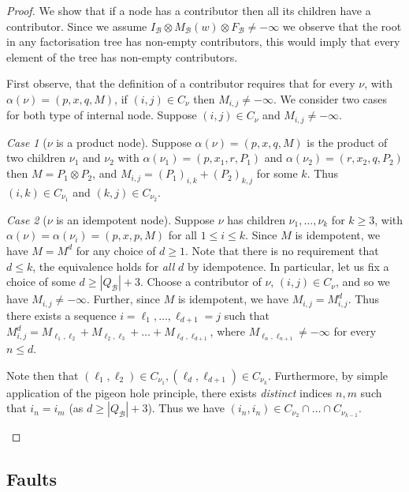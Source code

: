 \documentclass{lmcs}
\theoremstyle{remark}
\newtheorem{case}{Case}
\newcommand{\autB}{\mathcal{B}}
\theoremstyle{remark}
\begin{document}
\begin{proof}
We show that if a node has a contributor then all its children have a contributor. Since we assume $I_\autB \otimes M_\autB(w)\otimes F_\autB\ne-\infty$ we observe that the root in any factorisation tree has non-empty contributors, this would imply that every element of the tree has non-empty contributors.

First observe, that the definition of a contributor requires that for every $\nu$, with $\alpha(\nu) = (p,x,q,M)$, if $(i,j)\in C_\nu$ then $M_{i,j}\ne -\infty$. We consider two cases for both type of internal node. Suppose $(i,j) \in C_{\nu}$ and $M_{i,j}\ne-\infty$. 

\begin{case}[$\nu$ is a product node]Suppose  $\alpha(\nu) = (p,x,q,M)$ is the product of two children  $\nu_1$ and $\nu_2$ with $\alpha(\nu_1) = (p,x_1,r,P_1)$ and $\alpha(\nu_2) = (r,x_2,q,P_2)$ then $M = P_1\otimes P_2$, and $M_{i,j} = (P_1)_{i,k}+ (P_2)_{k,j}$ for some $k$. Thus $(i,k)\in C_{\nu_1}$ and $(k,j) \in C_{\nu_2}$.
\end{case}
\begin{case}[$\nu$ is an idempotent node] Suppose $\nu$ has children $\nu_1,\dots, \nu_k$ for $k\ge 3$, with $\alpha(\nu) = \alpha(\nu_i) = (p,x,p,M)$ for all $1\le i\le k$.
Since $M$ is idempotent, we have $M = M^d$ for any choice of $d\ge 1$. Note that there is no requirement that $d\le k$, the equivalence holds for \emph{all} $d$ by idempotence.
In particular, let us fix a choice of some $d\ge |Q_\autB| + 3$.
Choose a contributor of $\nu$, $(i,j) \in C_{\nu}$, and so we have $M_{i,j} \ne -\infty$. Further, since $M$ is idempotent, we have $M_{i,j} = M^{d}_{i,j}$. Thus there exists a sequence $i = \ell_1,\dots,\ell_{d+1}=j$ such that $M^{d}_{i,j} = M_{\ell_1,\ell_2} + M_{\ell_2,\ell_3} + \dots + M_{\ell_{d},\ell_{d+1}}$, where $M_{\ell_n,\ell_{n+1}} \ne -\infty$ for every $n\le d$.  

 Note then that $(\ell_1,\ell_2) \in C_{\nu_1}, (\ell_{d},\ell_{d+1}) \in C_{\nu_k}$.
 Furthermore, by simple application of the pigeon hole principle, there exists \emph{distinct} indices $n,m$ such that $i_n = i_m$ (as $d \ge |Q_\autB|+3$). Thus we have $(i_n,i_n) \in C_{\nu_2}\cap \dots\cap C_{\nu_{k-1}}$.\qedhere
\end{case}
\end{proof}

\subsection{Faults}
\end{document}
